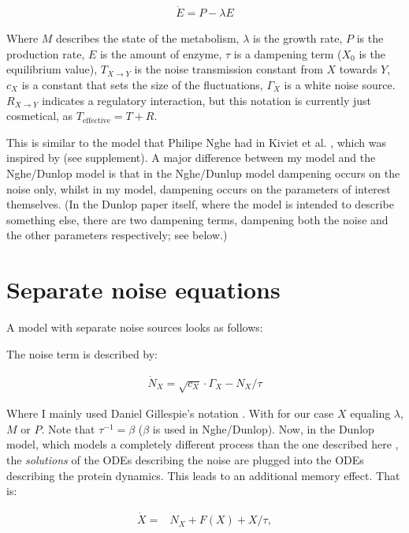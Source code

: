 \documentclass[a4paper,twoside,10pt]{report}
\begin{document}
\begin{align}
\label{mylastequation}
\dot{E} = P - \lambda E
\end{align}

Where $M$ describes the state of the metabolism, $\lambda$ is the growth rate, $P$ is the production rate, $E$ is the amount of enzyme, $\tau$ is a dampening term ($X_0$ is the equilibrium value), $T_{X \rightarrow Y}$ is the noise transmission constant from $X$ towards $Y$, $c_X$ is a constant that sets the size of the fluctuations, $\Gamma_X$ is a white noise source. %
$R_{X \rightarrow Y}$ indicates a regulatory interaction, but this notation is currently just cosmetical, as $T_\text{effective}=T+R$.

This is similar to the model that Philipe Nghe had in Kiviet et al. \cite{Kiviet2014}, which was inspired by \cite{Dunlop2008} (see supplement).
A major difference between my model and the Nghe/Dunlop model is that in the Nghe/Dunlup model dampening occurs on the noise only, whilst in my model, dampening occurs on the parameters of interest themselves.
(In the Dunlop paper itself, where the model is intended to describe something else, there are two dampening terms, dampening both the noise and the other parameters respectively; see below.)

\section{Separate noise equations}

A model with separate noise sources looks as follows:

The noise term is described by:

\begin{align}
\label{generalgillespienoise}
\dot{N}_X = \sqrt{c_X} \cdot \Gamma_X - N_X/\tau
\end{align}

Where I mainly used Daniel Gillespie's notation \cite{Gillespie1996}.
With for our case $X$ equaling $\lambda$, $M$ or $P$. Note that $\tau^{-1}=\beta$ ($\beta$ is used in Nghe/Dunlop).
Now, in the Dunlop model, which models a completely different process than the one described here \cite{Dunlop2008}, the \textit{solutions} of the ODEs describing the noise are plugged into the ODEs describing the protein dynamics. This leads to an additional memory effect.
%
That is:

\begin{align}
\label{dunlopgeneralequation}
\dot{X} = & N_X  + F(X) + X/\tau
,
\end{align}
\end{document}
